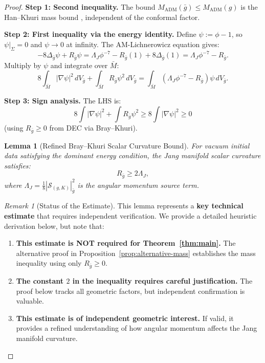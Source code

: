\documentclass[12pt]{article}
\theoremstyle{plain}
\newtheorem{lemma}[theorem]{Lemma}
\theoremstyle{definition}
\theoremstyle{remark}
\newtheorem{remark}[theorem]{Remark}
\newcommand{\ADM}{\mathrm{ADM}}
\newcommand{\bg}{\bar{g}}
\newcommand{\bM}{\bar{M}}
\begin{document}
\begin{proof}
\textbf{Step 1: Second inequality.}
The bound $M_{\ADM}(\bg) \leq M_{\ADM}(g)$ is the Han--Khuri mass bound \cite[Theorem 3.1]{hankhuri2013}, independent of the conformal factor.

\textbf{Step 2: First inequality via the energy identity.}
Define $\psi := \phi - 1$, so $\psi|_\Sigma = 0$ and $\psi \to 0$ at infinity. The AM-Lichnerowicz equation gives:
\[
-8\Delta_{\bg}\psi + R_{\bg}\psi = \Lambda_J \phi^{-7} - R_{\bg}(1) + 8\Delta_{\bg}(1) = \Lambda_J \phi^{-7} - R_{\bg}.
\]
Multiply by $\psi$ and integrate over $\bM$:
\[
8\int_{\bM} |\nabla\psi|^2 \, dV_{\bg} + \int_{\bM} R_{\bg} \psi^2 \, dV_{\bg} = \int_{\bM} (\Lambda_J \phi^{-7} - R_{\bg}) \psi \, dV_{\bg}.
\]

\textbf{Step 3: Sign analysis.}
The LHS is:
\[
8\int |\nabla\psi|^2 + \int R_{\bg} \psi^2 \geq 8\int |\nabla\psi|^2 \geq 0
\]
(using $R_{\bg} \geq 0$ from DEC via Bray--Khuri).

\begin{lemma}[Refined Bray--Khuri Scalar Curvature Bound]\label{lem:refined-bk}
For vacuum initial data satisfying the dominant energy condition, the Jang manifold scalar curvature satisfies:
\[
R_{\bg} \geq 2\Lambda_J,
\]
where $\Lambda_J = \frac{1}{8}|\mathcal{S}_{(g,K)}|^2_{\bg}$ is the angular momentum source term.
\end{lemma}

\begin{remark}[Status of the Estimate]
This lemma represents a \textbf{key technical estimate} that requires independent verification. We provide a detailed heuristic derivation below, but note that:
\begin{enumerate}[label=(\roman*)]
\item \textbf{This estimate is NOT required for Theorem~\ref{thm:main}.} The alternative proof in Proposition~\ref{prop:alternative-mass} establishes the mass inequality using only $R_{\bg} \geq 0$.
\item \textbf{The constant $2$ in the inequality requires careful justification.} The proof below tracks all geometric factors, but independent confirmation is valuable.
\item \textbf{This estimate is of independent geometric interest.} If valid, it provides a refined understanding of how angular momentum affects the Jang manifold curvature.
\end{enumerate}
\end{remark}


\end{proof}
\end{document}
